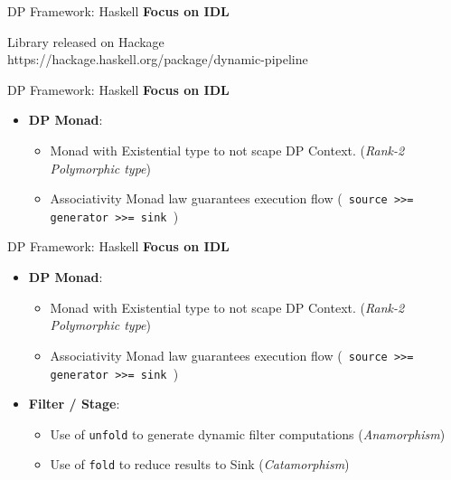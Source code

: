 \documentclass{beamer}
\begin{document}
  \begin{frame}[fragile]{DP Framework: Haskell}
    \textbf{Focus on IDL}

    \begin{block}{}
      Library released on Hackage \\
      https://hackage.haskell.org/package/dynamic-pipeline
    \end{block}
  \end{frame}

  \begin{frame}[fragile]{DP Framework: Haskell}
    \textbf{Focus on IDL}

    \begin{block}

      \begin{itemize}
        \item \textbf{DP Monad}: 
        \begin{itemize}
          \item Monad with Existential type to not scape DP Context. (\textit{Rank-2 Polymorphic type})
          \item Associativity Monad law guarantees execution flow (\texttt{ source >>= generator >>= sink }) 
        \end{itemize}
      \end{itemize}
      
    \end{block}
  \end{frame}

  \begin{frame}[fragile]{DP Framework: Haskell}
    \textbf{Focus on IDL}

    \begin{block}

      \begin{itemize}
        \item \textbf{DP Monad}: 
        \begin{itemize}
          \item Monad with Existential type to not scape DP Context. (\textit{Rank-2 Polymorphic type})
          \item Associativity Monad law guarantees execution flow (\texttt{ source >>= generator >>= sink }) 
        \end{itemize}
        \item \textbf{Filter / Stage}: 
        \begin{itemize}
          \item Use of \texttt{unfold} to generate dynamic filter computations (\textit{Anamorphism})
          \item Use of \texttt{fold} to reduce results to Sink (\textit{Catamorphism})
        \end{itemize}
      \end{itemize}
      
    \end{block}
  \end{frame}
\end{document}
